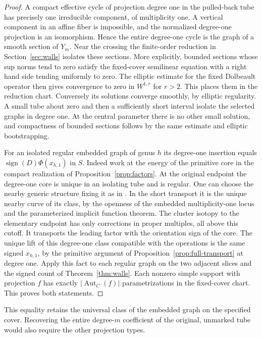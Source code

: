 \begin{proof}
A compact effective cycle of projection degree one in the pulled-back
tube has precisely one irreducible component, of multiplicity one.
A vertical component in an affine fiber is impossible, and the normalized
degree-one projection is an isomorphism. Hence the entire degree-one
cycle is the graph of a smooth section of $Y_m$. Near the crossing
the finite-order reduction in Section~\ref{sec:walls} isolates these
sections. More explicitly, bounded sections whose sup norms tend to
zero satisfy the fixed-cover semilinear equation with a right hand
side tending uniformly to zero. The elliptic estimate for the fixed
Dolbeault operator then gives convergence to zero in $W^{1,r}$ for
$r>2$. This places them in the reduction chart. Conversely its
solutions converge smoothly, by elliptic regularity. A small tube
about zero and then a sufficiently short interval isolate the
selected graphs in degree one. At the central parameter there is
no other small solution, and compactness of bounded sections follows
by the same estimate and elliptic bootstrapping.

For an isolated regular embedded graph of genus $h$ its degree-one
insertion equals $\operatorname{sign}(D)\Phi(x_{h,1})$ in $S$.
Indeed work at the energy of the primitive core in the compact
realization of Proposition~\ref{prop:factors}. At the original
endpoint the degree-one core is unique in an isolating tube and is
regular. One can choose the nearby generic structure fixing it as in
\cite[proof of Proposition~3.54]{diw}. In the short transport it is
the unique nearby curve of its class, by the openness of the embedded multiplicity-one locus
\cite[Proposition~2.21]{diw} and the parameterized implicit function theorem.
The cluster isotopy to the elementary endpoint has only corrections
in proper multiples, all above this cutoff. It transports the leading
factor with the orientation sign of the core.
The unique lift of this degree-one class compatible with the operations
is the same signed $x_{h,1}$, by the primitive argument of
Proposition~\ref{prop:full-transport} at degree one.
Apply this fact to each regular graph on the two adjacent slices
and the signed count of Theorem~\ref{thm:walls}. Each nonzero simple
support with projection $f$ has exactly $|\operatorname{Aut}_C(f)|$
parametrizations in the fixed-cover chart. This proves both statements.
\end{proof}

This equality retains the universal class of the embedded graph on the
specified cover. Recovering the entire degree-$m$ coefficient of the
original, unmarked tube would also require the other projection types.
